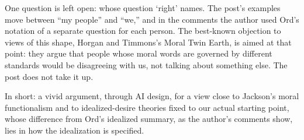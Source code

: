 \begin{afterword}
One question is left open: whose question `right' names. The post's examples move between ``my people'' and ``we,'' and in the comments the author used Ord's notation of a separate question for each person. The best-known objection to views of this shape, Horgan and Timmons's Moral Twin Earth, is aimed at that point: they argue that people whose moral words are governed by different standards would be disagreeing with us, not talking about something else. The post does not take it up.

In short: a vivid argument, through AI design, for a view close to Jackson's moral functionalism and to idealized-desire theories fixed to our actual starting point, whose difference from Ord's idealized summary, as the author's comments show, lies in how the idealization is specified.
\end{afterword}
